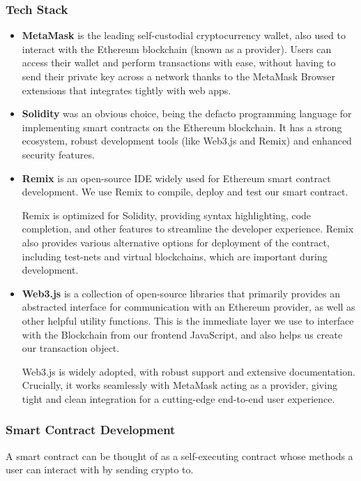 \documentclass[12pt,a4paper]{article}
\begin{document}
\subsubsection{Tech Stack}
\begin{itemize}
    \item \textbf{MetaMask} is the leading self-custodial cryptocurrency wallet, also used to interact with the Ethereum blockchain (known as a provider). Users can access their wallet and perform transactions with ease, without having to send their private key across a network thanks to the MetaMask Browser extensions that integrates tightly with web apps.
    \item \textbf{Solidity} was an obvious choice, being the defacto programming language for implementing smart contracts on the Ethereum blockchain. It has a strong ecosystem, robust development tools (like Web3.js and Remix) and enhanced security features.
    \item \textbf{Remix} is an open-source IDE widely used for Ethereum smart contract development. We use Remix to compile, deploy and test our smart contract. 
    
    Remix is optimized for Solidity, providing syntax highlighting, code completion, and other features to streamline the developer experience. Remix also provides various alternative options for deployment of the contract, including test-nets and virtual blockchains, which are important during development.
    \item \textbf{Web3.js} is a collection of open-source libraries that primarily provides an abstracted interface for communication with an Ethereum provider, as well as other helpful utility functions. This is the immediate layer we use to interface with the Blockchain from our frontend JavaScript, and also helps us create our transaction object. 
    
    Web3.js is widely adopted, with robust support and extensive documentation. Crucially, it works seamlessly with MetaMask acting as a provider, giving tight and clean integration for a cutting-edge end-to-end user experience.
\end{itemize}
\subsubsection{Smart Contract Development}
A smart contract can be thought of as a self-executing contract whose methods a user can interact with by sending crypto to.
\end{document}
